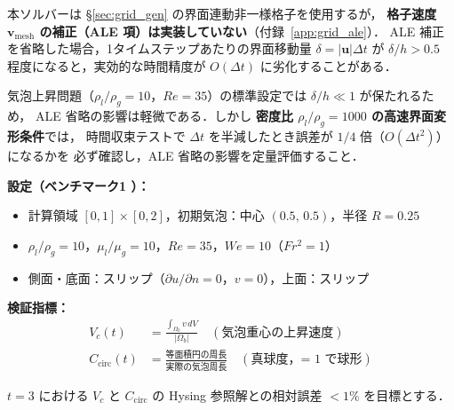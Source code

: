 \begin{tcolorbox}[warnbox, title={動格子使用時の時間精度に関する注意}]
本ソルバーは §\ref{sec:grid_gen} の界面連動非一様格子を使用するが，
\textbf{格子速度 $\bm{v}_\mathrm{mesh}$ の補正（ALE 項）は実装していない}（付録~\ref{app:grid_ale}）．
ALE 補正を省略した場合，1タイムステップあたりの界面移動量 $\delta = |\bm{u}|\Delta t$ が
$\delta/h > 0.5$ 程度になると，実効的な時間精度が $O(\Delta t)$ に劣化することがある．

気泡上昇問題（$\rho_l/\rho_g = 10$，$Re = 35$）の標準設定では $\delta/h \ll 1$ が保たれるため，
ALE 省略の影響は軽微である．しかし \textbf{密度比 $\rho_l/\rho_g = 1000$ の高速界面変形条件}では，
時間収束テストで $\Delta t$ を半減したとき誤差が $1/4$ 倍（$O(\Delta t^2)$）になるかを
必ず確認し，ALE 省略の影響を定量評価すること．
\end{tcolorbox}

\textbf{設定（ベンチマーク1 \cite{Hysing2009}）：}
\begin{itemize}
  \item 計算領域 $[0, 1] \times [0, 2]$，初期気泡：中心 $(0.5,\,0.5)$，半径 $R = 0.25$
  \item $\rho_l / \rho_g = 10$，$\mu_l / \mu_g = 10$，$Re = 35$，$We = 10$（$Fr^2 = 1$）
  \item 側面・底面：スリップ（$\partial u/\partial n = 0$，$v = 0$），上面：スリップ
\end{itemize}

\textbf{検証指標：}
\begin{align}
  V_c(t) &= \frac{\int_{\Omega_b} v \, dV}{|\Omega_b|}
  \quad (\text{気泡重心の上昇速度}) \label{eq:bubble_vc} \\
  C_{\mathrm{circ}}(t) &= \frac{\text{等面積円の周長}}{\text{実際の気泡周長}}
  \quad (\text{真球度，= 1 で球形}) \label{eq:bubble_circ}
\end{align}

$t = 3$ における $V_c$ と $C_{\mathrm{circ}}$ の Hysing 参照解との相対誤差 $< 1\%$ を目標とする．

